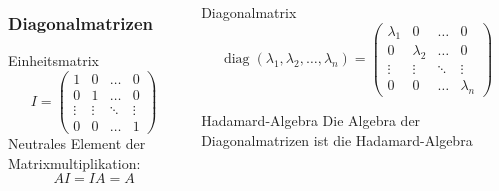 %
%
%
\begin{frame}[t]
\begin{columns}[t,onlytextwidth]
\begin{column}{0.38\textwidth}
\frametitle{Diagonalmatrizen}
\begin{block}{Einheitsmatrix}
\[
I=\begin{pmatrix}
1&0&\dots&0\\
0&1&\dots&0\\
\vdots&\vdots&\ddots&\vdots\\
0&0&\dots&1
\end{pmatrix}
\]
Neutrales Element der Matrixmultiplikation:
\[
AI=IA=A
\]
\end{block}
\end{column}
\begin{column}{0.58\textwidth}
\begin{block}{Diagonalmatrix}
\[
\operatorname{diag}(\lambda_1,\lambda_2,\dots,\lambda_n)
=
\begin{pmatrix}
\lambda_1&0&\dots&0\\
0&\lambda_2&\dots&0\\
\vdots&\vdots&\ddots&\vdots\\
0&0&\dots&\lambda_n
\end{pmatrix}
\]
\end{block}
\begin{block}{Hadamard-Algebra}
Die Algebra der Diagonalmatrizen ist die Hadamard-Algebra
\end{block}
\end{column}
\end{columns}
\end{frame}
